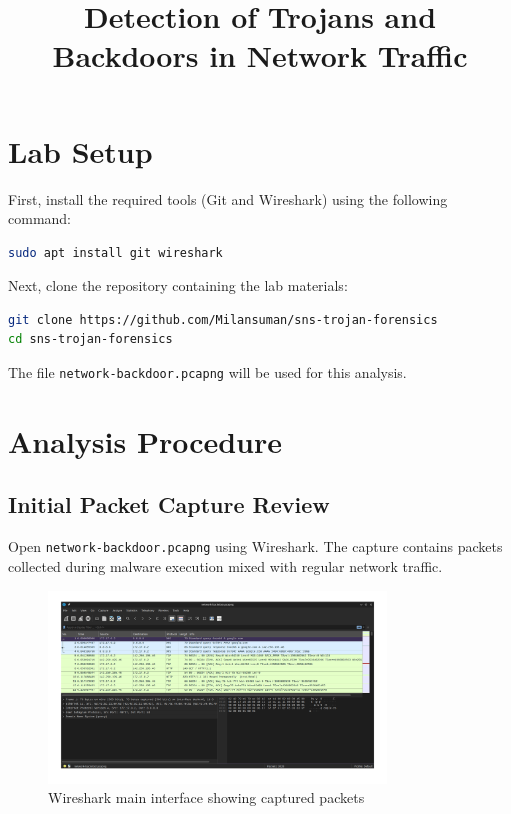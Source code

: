 \documentclass{article}
\title{Detection of Trojans and Backdoors in Network Traffic}
\author{}  %
\date{}
\begin{document}
\maketitle

\section{Lab Setup}
First, install the required tools (Git and Wireshark) using the following command:

\begin{lstlisting}[language=bash]
sudo apt install git wireshark
\end{lstlisting}

Next, clone the repository containing the lab materials:

\begin{lstlisting}[language=bash]
git clone https://github.com/Milansuman/sns-trojan-forensics
cd sns-trojan-forensics
\end{lstlisting}

The file \texttt{network-backdoor.pcapng} will be used for this analysis.

\section{Analysis Procedure}

\subsection{Initial Packet Capture Review}
Open \texttt{network-backdoor.pcapng} using Wireshark. The capture contains packets collected during malware execution mixed with regular network traffic.

\begin{figure}[H]
    \centering
    \includegraphics[width=0.8\textwidth]{1}
    \caption{Wireshark main interface showing captured packets}
\end{figure}
\end{document}
